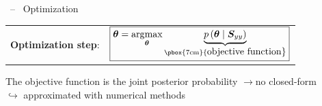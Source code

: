 \documentclass[10pt,xcolor=x11names,compress, show notes]{beamer}%
\begin{document}
\begin{frame}{\insertsectionhead ~--~ Optimization}
	\centering
	\vfill	
	\begin{tabular}{c c}
		\textbf{Optimization step}:&
		$\boxed{ \displaystyle  \bm{\theta} =\underset{\bm{\theta}}{\arg\!\max} \underbrace{p\left( \bm{\theta} \mid \bm{S}_{yy}\right)}_{ \text{\pbox{7cm}{\centering \normalsize objective function}}}}$ %
	\end{tabular}
	\vfill
	The objective function is the joint posterior probability  $\rightarrow$no closed-form\\
	$\hookrightarrow$ approximated with numerical methods
	


\end{frame}
\end{document}
